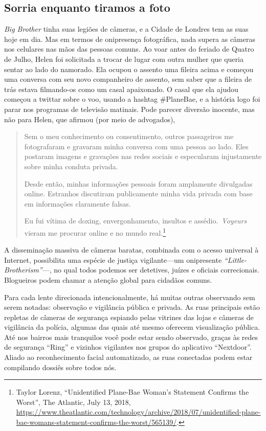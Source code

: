 \documentclass{book}
\newcommand{\ingles}[1]{\textit{#1}}
\begin{document}
\subsection{Sorria enquanto tiramos a foto}
\label{cap3:quem-que-sorria}

\ingles{Big Brother} tinha suas legiões de câmeras, e a Cidade de Londres tem
as suas hoje em dia. Mas em termos de onipresença fotográfica, nada supera as
câmeras nos celulares nas mãos das pessoas comuns. Ao voar antes do feriado de
Quatro de Julho, Helen foi solicitada a trocar de lugar com outra mulher que
queria sentar ao lado do namorado. Ela ocupou o assento uma fileira acima e começou
uma conversa com seu novo companheiro de assento, sem saber que a fileira de
trás estava filmando-os como um casal apaixonado. O casal que ela ajudou começou
a twittar sobre o voo, usando a hashtag \#PlaneBae, e a história logo foi parar
nos programas de televisão matinais. Pode parecer diversão inocente, mas não para
Helen, que afirmou (por meio de advogados),

\begin{quote}
    Sem o meu conhecimento ou consentimento, outros passageiros me fotografaram e
    gravaram minha conversa com uma pessoa ao lado. Eles postaram imagens e gravações
    nas redes sociais e especularam injustamente sobre minha conduta privada.

    Desde então, minhas informações pessoais foram amplamente divulgadas online.
    Estranhos discutiram publicamente minha vida privada com base em informações
    claramente falsas.

    Eu fui vítima de doxing, envergonhamento, insultos e assédio.~\ingles{Voyeurs}
    vieram me procurar online e no mundo real.\footnote{Taylor Lorenz,
    ``Unidentified Plane-Bae Woman's Statement Confirms the Worst'', The Atlantic,
    July 13, 2018,
    \url{https://www.theatlantic.com/technology/archive/2018/07/unidentified-plane-bae-womans-statement-confirms-the-worst/565139/}.}
\end{quote}

A disseminação massiva de câmeras baratas, combinada com o acesso universal à
Internet, possibilita uma espécie de justiça vigilante---um onipresente
\ingles{``Little-Brotherism''}---, no qual todos podemos ser detetives, juízes
e oficiais correcionais. Blogueiros podem chamar a atenção global para cidadãos
comuns.

Para cada lente direcionada intencionalmente, há muitas outras observando sem
serem notadas: observação e vigilância pública e privada. As ruas principais
estão repletas de câmeras de segurança espiando pelas vitrines das lojas e
câmeras de vigilância da polícia, algumas das quais até mesmo oferecem
visualização pública. Até nos bairros mais tranquilos você pode estar sendo
observado, graças às redes de segurança ``Ring'' e vizinhos vigilantes nos
grupos do aplicativo ``Nextdoor''. Aliado ao reconhecimento facial
automatizado, as ruas conectadas podem estar compilando dossiês sobre todos
nós.
\end{document}
